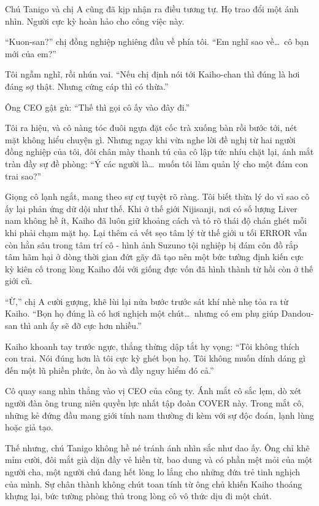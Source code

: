 \documentclass[../main.tex]{subfiles}
\begin{document}
Chú Tanigo và chị A cũng đã kịp nhận ra điều tương tự. Họ trao đổi một ánh nhìn. Người cực kỳ hoàn hảo cho công việc này.

``Kuon-san?'' chị đồng nghiệp nghiêng đầu về phía tôi. ``Em nghĩ sao về\dots\ cô bạn mới của em?''

Tôi ngẫm nghĩ, rồi nhún vai. ``Nếu chị định nói tới Kaiho-chan thì đúng là hơi đáng sợ thật. Nhưng cứng cáp thì có thừa.''

Ông CEO gật gù: ``Thế thì gọi cô ấy vào đây đi.''

Tôi ra hiệu, và cô nàng tóc đuôi ngựa đặt cốc trà xuống bàn rồi bước tới, nét mặt không hiểu chuyện gì. Nhưng ngay khi vừa nghe lời đề nghị từ hai người đồng nghiệp của tôi, đôi chân mày thanh tú của cô lập tức nhíu chặt lại, ánh mắt tràn đầy sự đề phòng: ``Ý các người là\dots\ muốn tôi làm quản lý cho một đám con trai sao?''

Giọng cô lạnh ngắt, mang theo sự cự tuyệt rõ ràng. Tôi biết thừa lý do vì sao cô ấy lại phản ứng dữ dội như thế. Khi ở thế giới Nijisanji, nơi có số lượng Liver nam không hề ít, Kaiho đã luôn giữ khoảng cách và tỏ rõ thái độ chán ghét mỗi khi phải chạm mặt họ. Lại thêm cả vết sẹo tâm lý từ thế giới u tối ERROR vẫn còn hằn sâu trong tâm trí cô - hình ảnh Suzuno tội nghiệp bị đám côn đồ rắp tâm hãm hại ở dòng thời gian đứt gãy đã tạo nên một bức tường định kiến cực kỳ kiên cố trong lòng Kaiho đối với giống đực vốn đã hình thành từ hồi còn ở thế giới cũ.

``Ừ,'' chị A cười gượng, khẽ lùi lại nửa bước trước sát khí nhè nhẹ tỏa ra từ Kaiho. ``Bọn họ đúng là có hơi nghịch một chút\dots\ nhưng có em phụ giúp Dandou-san thì anh ấy sẽ đỡ cực hơn nhiều.''

Kaiho khoanh tay trước ngực, thẳng thừng dập tắt hy vọng: ``Tôi không thích con trai. Nói đúng hơn là tôi cực kỳ ghét bọn họ. Tôi không muốn dính dáng gì đến một lũ phiền phức, ồn ào và đầy nguy hiểm đó cả.''

Cô quay sang nhìn thẳng vào vị CEO của công ty. Ánh mắt cô sắc lẹm, dò xét người đàn ông trung niên quyền lực nhất tập đoàn COVER này. Trong mắt cô, những kẻ đứng đầu mang giới tính nam thường đi kèm với sự độc đoán, lạnh lùng hoặc giả tạo.

Thế nhưng, chú Tanigo không hề né tránh ánh nhìn sắc như dao ấy. Ông chỉ khẽ mỉm cười, đôi mắt già dặn đầy vẻ hiền từ, bao dung và có phần mệt mỏi của một người cha, một người chú đang hết lòng lo lắng cho những đứa trẻ tinh nghịch của mình. Sự chân thành không chút toan tính từ ông chủ khiến Kaiho thoáng khựng lại, bức tường phòng thủ trong lòng cô vô thức dịu đi một chút.
\end{document}
